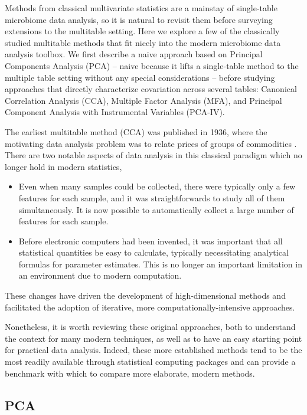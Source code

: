 \documentclass[14pt]{extarticle}
\begin{document}
Methods from classical multivariate statistics are a mainstay of single-table
microbiome data analysis, so it is natural to revisit them before surveying
extensions to the multitable setting. Here we explore a few of the classically
studied multitable methods that fit nicely into the modern microbiome data
analysis toolbox. We first describe a naive approach based on Principal
Components Analysis (PCA) -- naive because it lifts a single-table method to the
multiple table setting without any special considerations -- before studying
approaches that directly characterize covariation across several tables:
Canonical Correlation Analysis (CCA), Multiple Factor Analysis (MFA), and
Principal Component Analysis with Instrumental Variables (PCA-IV).

The earliest multitable method (CCA) was published in 1936, where the motivating
data analysis problem was to relate prices of groups of commodities
\citep{hotelling1936relations}. There are two notable aspects of data analysis in
this classical paradigm which no longer hold in modern statistics,
\begin{itemize}
  \item Even when many samples could be collected, there were typically only a
    few features for each sample, and it was straightforwards to study all of
    them simultaneously. It is now possible to automatically collect a large
    number of features for each sample.
  \item Before electronic computers had been invented, it was important that all
    statistical quantities be easy to calculate, typically necessitating
    analytical formulas for parameter estimates. This is no longer an important
    limitation in an environment due to modern computation.
\end{itemize}

These changes have driven the development of high-dimensional methods and
facilitated the adoption of iterative, more computationally-intensive
approaches.

Nonetheless, it is worth reviewing these original approaches, both to understand
the context for many modern techniques, as well as to have an easy starting
point for practical data analysis. Indeed, these more established methods tend
to be the most readily available through statistical computing packages and can
provide a benchmark with which to compare more elaborate, modern methods.

\subsection{PCA}
\label{subsec:pca}
\end{document}
